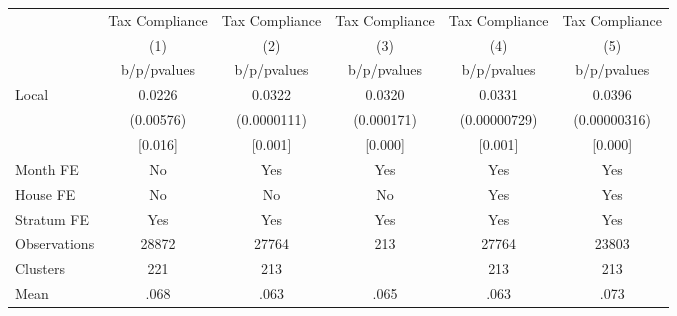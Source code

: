 {
\def\sym#1{\ifmmode^{#1}\else\(^{#1}\)\fi}
\begin{tabular}{l*{5}{c}}
\toprule
                &\multicolumn{1}{c}{Tax Compliance}&\multicolumn{1}{c}{Tax Compliance}&\multicolumn{1}{c}{Tax Compliance}&\multicolumn{1}{c}{Tax Compliance}&\multicolumn{1}{c}{Tax Compliance}\\
                &\multicolumn{1}{c}{(1)}&\multicolumn{1}{c}{(2)}&\multicolumn{1}{c}{(3)}&\multicolumn{1}{c}{(4)}&\multicolumn{1}{c}{(5)}\\
                &b/p/pvalues&b/p/pvalues&b/p/pvalues&b/p/pvalues&b/p/pvalues\\
\midrule
Local           &   0.0226&   0.0322&   0.0320&   0.0331&   0.0396\\
                &(0.00576)&(0.0000111)&(0.000171)&(0.00000729)&(0.00000316)\\
                &  [0.016]&  [0.001]&  [0.000]&  [0.001]&  [0.000]\\
Month FE        &       No&      Yes&      Yes&      Yes&      Yes\\
House FE        &       No&       No&       No&      Yes&      Yes\\
Stratum FE      &      Yes&      Yes&      Yes&      Yes&      Yes\\
\midrule
Observations    &    28872&    27764&      213&    27764&    23803\\
Clusters        &      221&      213&         &      213&      213\\
Mean            &     .068&     .063&     .065&     .063&     .073\\
\bottomrule
\end{tabular}
}
